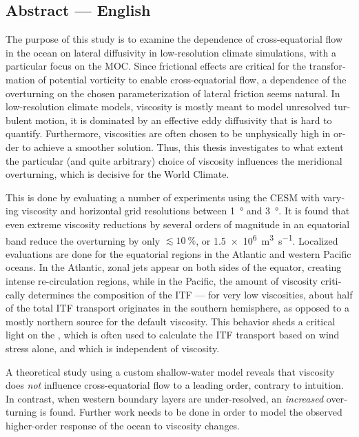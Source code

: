 
\begin{otherlanguage}{american}
\section*{Abstract --- English}

The purpose of this study is to examine the dependence of cross-equatorial flow in the ocean on lateral diffusivity in low-resolution climate simulations, with a particular focus on the \ac{MOC}. Since frictional effects are critical for the transformation of potential vorticity to enable cross-equatorial flow, a dependence of the overturning on the chosen parameterization of lateral friction seems natural. In low-resolution climate models, viscosity is mostly meant to model unresolved turbulent motion, \ie it is dominated by an effective eddy diffusivity that is hard to quantify. Furthermore, viscosities are often chosen to be unphysically high in order to achieve a smoother solution. Thus, this thesis investigates to what extent the particular (and quite arbitrary) choice of viscosity influences the meridional overturning, which is decisive for the World Climate.

This is done by evaluating a number of experiments using the \acf{CESM} with varying viscosity and horizontal grid resolutions between \SI{1}{\degree} and \SI{3}{\degree}. It is found that even extreme viscosity reductions by several orders of magnitude in an equatorial band reduce the overturning by only \(\lesssim \SI{10}{\percent}\), or \SI{1.5e6}{\metre\cubed\per\second}. Localized evaluations are done for the equatorial regions in the Atlantic and western Pacific oceans. In the Atlantic, zonal jets appear on both sides of the equator, creating intense re-circulation regions, while in the Pacific, the amount of viscosity critically determines the composition of the \acf{ITF} --- for very low viscosities, about half of the total \ac{ITF} transport originates in the southern hemisphere, as opposed to a mostly northern source for the default viscosity. This behavior sheds a critical light on the , which is often used to calculate the \ac{ITF} transport based on wind stress alone, and which is independent of viscosity.

A theoretical study using a custom shallow-water model reveals that viscosity does \emph{not} influence cross-equatorial flow to a leading order, contrary to intuition. In contrast, when western boundary layers are under-resolved, an \emph{increased} overturning is found. Further work needs to be done in order to model the observed higher-order response of the ocean to viscosity changes.
\end{otherlanguage}

